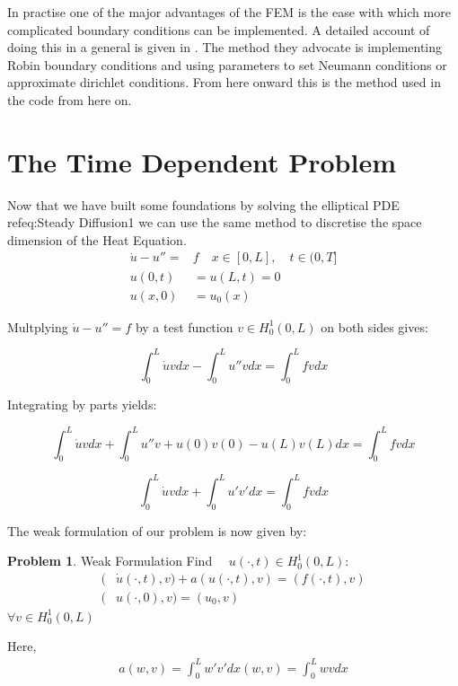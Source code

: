 \documentclass{uonmathreport}
\theoremstyle{definition}
\theoremstyle{problem}
\newtheorem{problem}{Problem}[section]
\theoremstyle{theorem}
\begin{document}
In practise one of the major advantages of the FEM is the ease with which more complicated boundary conditions can be implemented. A detailed account of doing this in a general is given in \cite{larson2013finite}. The method they advocate is implementing Robin boundary conditions and using parameters to set Neumann conditions or approximate dirichlet conditions. From here onward this is the method used in the code from here on.

\clearpage

\section{The Time Dependent Problem} \label{sec:Time dependent}



Now that we have built some foundations by solving the elliptical PDE ref{eq:Steady Diffusion1} we can use the same method to discretise the space dimension of the Heat Equation.
\begin{subequations} 
\begin{align}
  \dot{u} - u'' = & f \quad x \in [0, L], \quad t \in (0, T]  \\ \label{eq:Simple Heat}
  u(0, t) & = u(L, t) = 0\\
  u(x, 0) & = u_0(x)   
\end{align}
\end{subequations}

Multplying $\dot{u} - u'' = f$ by a test function  $v \in H^1_0(0, L)$  on both sides gives:

\begin{equation*}
  \int_0^L \dot{u} v dx  - \int_0^L  u'' v  dx =   \int_0^L  f v  dx   
\end{equation*}

Integrating by parts yields:

\begin{equation*}
  \int_0^L \dot{u} v dx  + \int_0^L  u'' v  +u(0)v(0) - u(L)v(L) dx =   \int_0^L  f v  dx   
\end{equation*}

\begin{equation*}
  \int_0^L \dot{u} v dx +  \int_0^L  u' v'  dx =   \int_0^L  f v  dx    
\end{equation*}

The weak formulation of our problem is now given by:

\begin{problem}{Weak Formulation} \label{weak2}
Find $\quad u(\cdot, t) \in H^1_0(0, L)$:
\begin{align*}
	(&\dot{u}(\cdot, t), v) + a(u(\cdot, t), v) = (f(\cdot, t), v)\\
	(&u(\cdot, 0), v) = (u_0, v)
\end{align*}
$\forall v \in H^1_0(0, L)$
\end{problem}
Here,
\begin{align*}
 a(w, v)  = \int_0^L  w' v'  dx 
 (w, v) = \int_0^L  w v  dx 
\end{align*}
\end{document}
